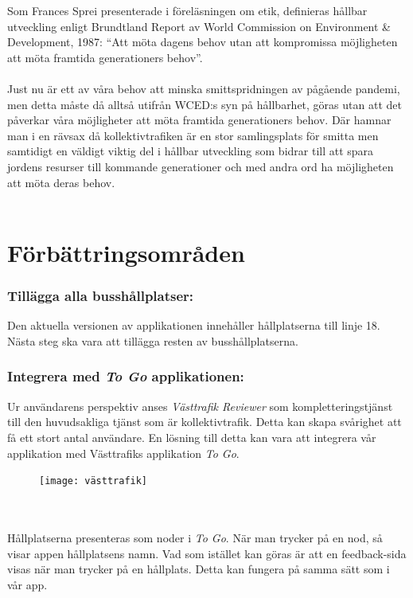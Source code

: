 \documentclass{article}
\begin{document}
Som Frances Sprei presenterade i föreläsningen om etik, definieras hållbar utveckling enligt Brundtland Report av World Commission on Environment \& Development, 1987: “Att möta dagens behov utan att kompromissa möjligheten att möta framtida generationers behov”.  
\\\\
Just nu är ett av våra behov att minska smittspridningen av pågående pandemi, men detta måste då alltså utifrån WCED:s syn på hållbarhet, göras utan att det påverkar våra möjligheter att möta framtida generationers behov. Där hamnar man i en rävsax då kollektivtrafiken är en stor samlingsplats för smitta men samtidigt en väldigt viktig del i hållbar utveckling som bidrar till att spara jordens resurser till kommande generationer och med andra ord ha möjligheten att möta deras behov. 
\\\\
\section*{Förbättringsområden}
\subsubsection*{Tillägga alla busshållplatser: }
Den aktuella versionen av applikationen innehåller hållplatserna till linje 18. Nästa steg ska vara att tillägga resten av busshållplatserna.
\subsubsection*{Integrera med \textit{To Go} applikationen: }
Ur användarens perspektiv anses \textit{Västtrafik Reviewer} som kompletteringstjänst till den huvudsakliga tjänst som är kollektivtrafik. Detta kan skapa svårighet att få ett stort antal användare. En lösning till detta kan vara att integrera vår applikation med Västtrafiks applikation \textit{To Go}.
\begin{figure}[htp]
    \centering
    \texttt{[image: västtrafik]}
    \label{fig:Map}
\end{figure}
\\\\
Hållplatserna presenteras som noder i \textit{To Go}. När man trycker på en nod, så visar appen hållplatsens namn. Vad som istället kan göras är att en feedback-sida visas när man trycker på en hållplats. Detta kan fungera på samma sätt som i vår app.
\end{document}
